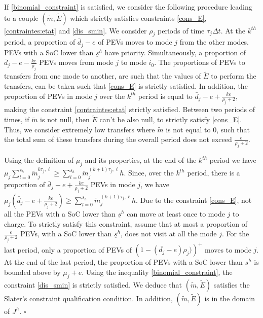 \documentclass[conference]{IEEEtran}
\begin{document}
If \eqref{binomial_constraint} is satisfied, we consider the following procedure leading to a couple $(\tilde{m}, \tilde{E})$ which strictly satisfies constraints  \eqref{cons_E}, \eqref{contraintes:etat} and \eqref{dis_smin}. 
We consider $\rho_j$ periods of time $\tau_j \Delta t$. At the $k^{th}$ period, a proportion of $\bar{d}_j-e$ of PEVs moves to mode $j$ from the other modes. PEVs with a SoC lower than $\underline{s}^h$ have priority. Simultaneously, a proportion of $\textstyle \bar{d}_j-e-\frac{ke}{\rho_j} $ PEVs moves from mode $j$ to mode $i_0$. The proportions of PEVs to transfers from one mode to another, are such that the values of $\tilde{E}$ to perform the transfers, can be taken such that \eqref{cons_E} is strictly satisfied. In addition, the proportion of PEVs in mode $j$ over the $k^{th}$ period is equal to $\textstyle\bar{d}_j -e + \frac{ke}{\rho_j+2}$, making the constraint  \eqref{contraintes:etat} strictly satisfied. Between two periods of times, if  $\tilde{m}$ is not null, then $\tilde{E}$ can't be also null, to strictly satisfy \eqref{cons_E}. Thus, we consider extremely low transfers where $\tilde{m}$ is not equal to 0, such that the total sum of these transfers during the overall period does not exceed $\textstyle \frac{e}{\rho_j+2}$.

Using the definition of $\mu_j$ and its properties, at the end of the $k^{th}$ period we have $\textstyle \mu_j \sum_{l = 0}^{s_h}\tilde{m}_j^{k \tau_j,\ell}\geq  \sum_{l = 0}^{s_h}\tilde{m}_j^{(k+1)\tau_j,\ell}h$. Since, over the $k^{th}$ period, there is a proportion of $\textstyle \bar{d}_j-e+\frac{ke}{\rho_j+2}$ PEVs in mode $j$, we have $\textstyle \mu_j\left(\bar{d}_j-e+\frac{ke}{\rho_j+2}\right)\geq  \sum_{l = 0}^{s_h}\tilde{m}_j^{(k+1)\tau_j,\ell}h$.
Due to the constraint \eqref{cons_E}, not all the PEVs with a SoC lower than $\underline{s}^h$ can move at least once to mode $j$ to charge. To strictly satisfy this constraint, assume that at most a proportion of $\textstyle \frac{e}{\rho_j +2}$ PEVs, with a SoC lower than $\underline{s}^h$, does not visit at all the mode $j$. 
For the last period, only a proportion of PEVs of $\textstyle \left(1-(\bar{d_j}-e)\rho_j)\right)^+$ moves to mode $j$. At the end of the last period, the proportion of PEVs with a SoC lower than $\underline{s}^h$ is bounded above by $\mu_j+e$. Using the inequality \eqref{binomial_constraint}, the constraint \eqref{dis_smin} is strictly satisfied. We deduce that $(\tilde{m},\tilde{E})$ satisfies the Slater’s constraint qualification condition. In addition, $(\tilde{m},\tilde{E})$ is in the domain of $J^h$. 
\hfill{$\square$}
\end{document}
